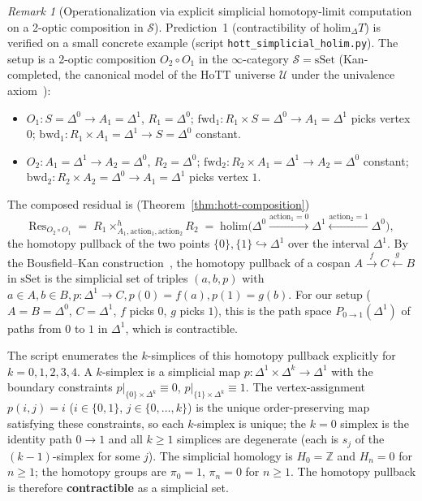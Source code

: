 \documentclass[11pt,a4paper]{article}
\theoremstyle{plain}
\theoremstyle{definition}
\theoremstyle{remark}
\newtheorem{remark}[theorem]{Remark}
\begin{document}
\begin{remark}[Operationalization via explicit simplicial homotopy-limit
computation on a 2-optic composition in $\mathcal{S}$]
\label{rem:hott-holim}
Prediction~1 (contractibility of $\mathrm{holim}_\Delta T$) is verified
on a small concrete example (script
\texttt{hott\_simplicial\_holim.py}). The setup is a 2-optic composition
$O_2 \circ O_1$ in the $\infty$-category $\mathcal{S} = \mathrm{sSet}$
(Kan-completed, the canonical model of the HoTT universe $\mathcal{U}$
under the univalence axiom~\cite{hottbook2013}):
\begin{itemize}[leftmargin=*, itemsep=2pt]
\item $O_1 : S = \Delta^0 \to A_1 = \Delta^1$, $R_1 = \Delta^0$;
  $\mathrm{fwd}_1 : R_1 \times S = \Delta^0 \to A_1 = \Delta^1$ picks
  vertex $0$;
  $\mathrm{bwd}_1 : R_1 \times A_1 = \Delta^1 \to S = \Delta^0$
  constant.
\item $O_2 : A_1 = \Delta^1 \to A_2 = \Delta^0$, $R_2 = \Delta^0$;
  $\mathrm{fwd}_2 : R_2 \times A_1 = \Delta^1 \to A_2 = \Delta^0$
  constant;
  $\mathrm{bwd}_2 : R_2 \times A_2 = \Delta^0 \to A_1 = \Delta^1$
  picks vertex $1$.
\end{itemize}
The composed residual is (Theorem~\ref{thm:hott-composition})
\[
  \mathrm{Res}_{O_2 \circ O_1} \;=\; R_1 \times^h_{A_1, \mathrm{action}_1, \mathrm{action}_2} R_2
  \;=\; \mathrm{holim}\bigl( \Delta^0 \xrightarrow{\mathrm{action}_1 = 0} \Delta^1 \xleftarrow{\mathrm{action}_2 = 1} \Delta^0 \bigr),
\]
the homotopy pullback of the two points $\{0\}, \{1\} \hookrightarrow
\Delta^1$ over the interval $\Delta^1$. By the Bousfield--Kan
construction~\cite[Ch.~XI]{cisinski2019}, the homotopy pullback of a
cospan $A \xrightarrow{f} C \xleftarrow{g} B$ in $\mathrm{sSet}$ is
the simplicial set of triples $(a, b, p)$ with $a \in A, b \in B, p :
\Delta^1 \to C, p(0) = f(a), p(1) = g(b)$. For our setup
($A = B = \Delta^0$, $C = \Delta^1$, $f$ picks $0$, $g$ picks $1$),
this is the path space $P_{0 \to 1}(\Delta^1)$ of paths from $0$ to
$1$ in $\Delta^1$, which is contractible.

The script enumerates the $k$-simplices of this homotopy pullback
explicitly for $k = 0, 1, 2, 3, 4$. A $k$-simplex is a simplicial
map $p : \Delta^1 \times \Delta^k \to \Delta^1$ with the boundary
constraints $p|_{\{0\} \times \Delta^k} \equiv 0$,
$p|_{\{1\} \times \Delta^k} \equiv 1$. The vertex-assignment
$p(i, j) = i$ ($i \in \{0, 1\}$, $j \in \{0, \ldots, k\}$) is the
unique order-preserving map satisfying these constraints, so each
$k$-simplex is unique; the $k = 0$ simplex is the identity path
$0 \to 1$ and all $k \geq 1$ simplices are degenerate (each is
$s_j$ of the $(k-1)$-simplex for some $j$). The simplicial homology
is $H_0 = \mathbb{Z}$ and $H_n = 0$ for $n \geq 1$; the homotopy
groups are $\pi_0 = 1$, $\pi_n = 0$ for $n \geq 1$. The homotopy
pullback is therefore \textbf{contractible} as a simplicial set.


\end{remark}
\end{document}
